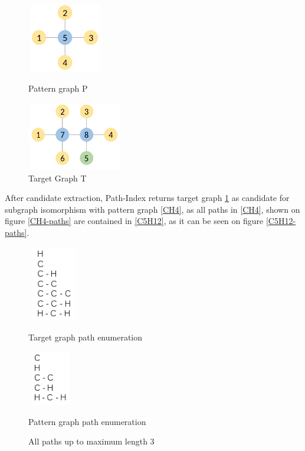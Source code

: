 \documentclass{l4proj}
\begin{document}
\begin{figure}[H]
\centering
\begin{minipage}[t]{.5\textwidth}
  \centering
  \includegraphics[height=3cm,width=3.3cm]{images/graphs/CH4.png}
  \caption{Pattern graph P}
  \label{CH4}
\end{minipage}%
\begin{minipage}[t]{.5\textwidth}
  \centering
  \includegraphics[height=3cm,width=4.2cm]{images/graphs/B2Y5G.png}
  \caption{Target Graph T}
  \label{B2Y5G}
\end{minipage}
\end{figure}
After candidate extraction, Path-Index returns target graph \ref{B2Y5G} as candidate for subgraph isomorphism with pattern graph \ref{CH4}, as all paths in \ref{CH4}, shown on figure \ref{CH4-paths} are contained in \ref{C5H12}, as it can be seen on figure \ref{C5H12-paths}.\par
\begin{figure}[H]
\centering
\begin{minipage}[t]{.5\textwidth}
  \centering
  \includegraphics[height=3.3cm,width=2.3cm]{images/paths/C5H12.png}
  \caption{Target graph path enumeration}
  \label{C5H12-paths}
\end{minipage}%
\begin{minipage}[t]{.5\textwidth}
  \centering
  \includegraphics[height=2.4cm,width=2cm]{images/paths/CH4.png}
  \caption{Pattern graph path enumeration}
  \label{CH4-paths}
\end{minipage}
\caption{All paths up to maximum length 3}
\label{pathsEnumeration}
\end{figure}
\end{document}
